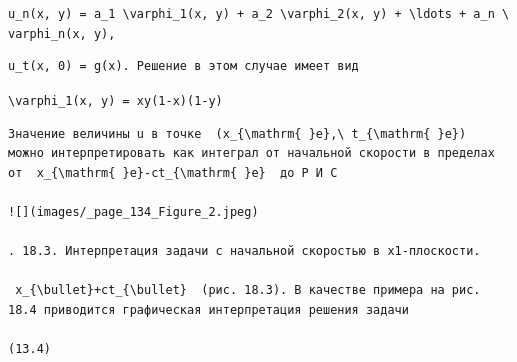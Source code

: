 \documentclass[
  ukrainian,
]{article}
\begin{document}
\texttt{u\_n(x,\ y)\ =\ a\_1\ \textbackslash{}varphi\_1(x,\ y)\ +\ a\_2\ \textbackslash{}varphi\_2(x,\ y)\ +\ \textbackslash{}ldots\ +\ a\_n\ \textbackslash{}varphi\_n(x,\ y),}

\begin{verbatim}
u_t(x, 0) = g(x). Решение в этом случае имеет вид
\end{verbatim}

\texttt{\textbackslash{}varphi\_1(x,\ y)\ =\ xy(1-x)(1-y)}

\begin{verbatim}
Значение величины u в точке  (x_{\mathrm{ }e},\ t_{\mathrm{ }e})  можно интерпретировать как интеграл от начальной скорости в пределах от  x_{\mathrm{ }e}-ct_{\mathrm{ }e}  до Р И С

![](images/_page_134_Figure_2.jpeg)

. 18.3. Интерпретация задачи с начальной скоростью в x1-плоскости.

 x_{\bullet}+ct_{\bullet}  (рис. 18.3). В качестве примера на рис. 18.4 приводится графическая интерпретация решения задачи

(13.4)
\end{verbatim}
\end{document}
